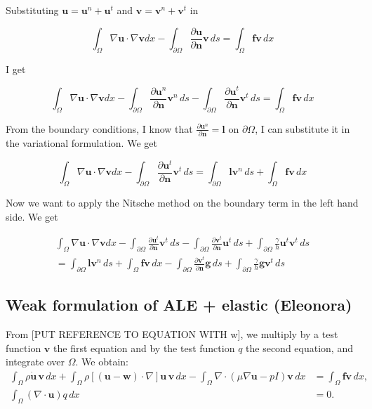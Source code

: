 \documentclass[11pt,a4paper,titlepage]{report}
\begin{document}
Substituting $\mathbf{u} = \mathbf{u}^n + \mathbf{u}^t$ and $\mathbf{v} = \mathbf{v}^n + \mathbf{v}^t$ in

\[
\int_\Omega \nabla \mathbf{u} \cdot \nabla \mathbf{v} dx
- \int_{\partial \Omega} \frac{\partial \mathbf{u}}{\partial \mathbf{n}} \mathbf{v} \, ds = \int_\Omega \mathbf{fv} \, dx
\]

I get

\[
\int_\Omega \nabla \mathbf{u} \cdot \nabla \mathbf{v} dx
- \int_{\partial \Omega} \frac{\partial \mathbf{u}^n}{\partial \mathbf{n}} \mathbf{v}^n \, ds
- \int_{\partial \Omega} \frac{\partial \mathbf{u}^t}{\partial \mathbf{n}} \mathbf{v}^t \, ds
= \int_\Omega \mathbf{fv} \, dx
\]

From the boundary conditions, I know that $\frac{\partial \mathbf{u}^n}{\partial \mathbf{n}} = \mathbf{l} $ on $\partial \Omega$, I can substitute it in the variational formulation. We get

\[
\int_\Omega \nabla \mathbf{u} \cdot \nabla \mathbf{v} dx
- \int_{\partial \Omega} \frac{\partial \mathbf{u}^t}{\partial \mathbf{n}} \mathbf{v}^t \, ds
=  \int_{\partial \Omega} \mathbf{l} \mathbf{v}^n \, ds
+ \int_\Omega \mathbf{fv} \, dx
\]

Now we want to apply the Nitsche method on the boundary term in the left hand side. We get

\begin{align*}
\int_\Omega \nabla \mathbf{u} \cdot \nabla \mathbf{v} dx
- \int_{\partial \Omega} \frac{\partial \mathbf{u}^t}{\partial \mathbf{n}} \mathbf{v}^t \, ds
- \int_{\partial \Omega} \frac{\partial \mathbf{v}^t}{\partial \mathbf{n}} \mathbf{u}^t \, ds
+ \int_{\partial \Omega} \frac{\gamma}{h} \mathbf{u}^t \mathbf{v}^t \, ds \\
=  \int_{\partial \Omega} \mathbf{l} \mathbf{v}^n \, ds
+ \int_\Omega \mathbf{fv} \, dx
 - \int_{\partial \Omega} \frac{\partial \mathbf{v}^t}{\partial \mathbf{n}} \mathbf{g} \, ds
+ \int_{\partial \Omega} \frac{\gamma}{h} \mathbf{g} \mathbf{v}^t \, ds
\end{align*}


\subsection{Weak formulation of  ALE + elastic (Eleonora)}

From [PUT REFERENCE TO EQUATION WITH w], we multiply by a test function $\mathbf{v}$ the first equation and by the test function $q$ the second equation, and integrate over $\Omega$. We obtain:
\begin{align*}
\int_{\Omega} \rho \dot{\mathbf{u}} \, \mathbf{v} \, dx
+ \int_{\Omega} \rho [(\mathbf{u - w}) \cdot \nabla] \mathbf{u} \, \mathbf{v} \, dx
- \int_{\Omega} \nabla \cdot (\mu \nabla \mathbf{u} - pI)\mathbf{v} \, dx
&= \int_{\Omega} \mathbf{f} \mathbf{v} \, dx, \\
\int_{\Omega}  (\nabla \cdot \mathbf{u}) q \, dx &= 0.
\end{align*}
\end{document}
